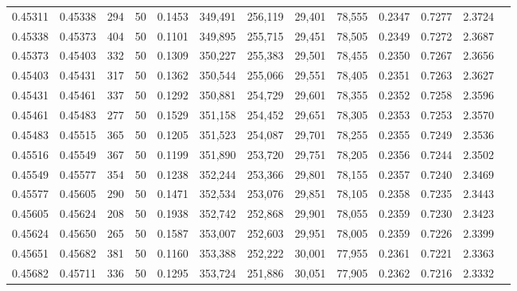 \begin{tabular}{rrrrrrrrrrrrr}
0.45311 & 0.45338 &   294 &  50 &                                     0.1453 & 349,491 & 256,119 &  29,401 &  78,555 & 0.2347 & 0.7277 & 2.3724 \\
0.45338 & 0.45373 &   404 &  50 &                                     0.1101 & 349,895 & 255,715 &  29,451 &  78,505 & 0.2349 & 0.7272 & 2.3687 \\
0.45373 & 0.45403 &   332 &  50 &                                     0.1309 & 350,227 & 255,383 &  29,501 &  78,455 & 0.2350 & 0.7267 & 2.3656 \\
0.45403 & 0.45431 &   317 &  50 &                                     0.1362 & 350,544 & 255,066 &  29,551 &  78,405 & 0.2351 & 0.7263 & 2.3627 \\
0.45431 & 0.45461 &   337 &  50 &                                     0.1292 & 350,881 & 254,729 &  29,601 &  78,355 & 0.2352 & 0.7258 & 2.3596 \\
0.45461 & 0.45483 &   277 &  50 &                                     0.1529 & 351,158 & 254,452 &  29,651 &  78,305 & 0.2353 & 0.7253 & 2.3570 \\
0.45483 & 0.45515 &   365 &  50 &                                     0.1205 & 351,523 & 254,087 &  29,701 &  78,255 & 0.2355 & 0.7249 & 2.3536 \\
0.45516 & 0.45549 &   367 &  50 &                                     0.1199 & 351,890 & 253,720 &  29,751 &  78,205 & 0.2356 & 0.7244 & 2.3502 \\
0.45549 & 0.45577 &   354 &  50 &                                     0.1238 & 352,244 & 253,366 &  29,801 &  78,155 & 0.2357 & 0.7240 & 2.3469 \\
0.45577 & 0.45605 &   290 &  50 &                                     0.1471 & 352,534 & 253,076 &  29,851 &  78,105 & 0.2358 & 0.7235 & 2.3443 \\
0.45605 & 0.45624 &   208 &  50 &                                     0.1938 & 352,742 & 252,868 &  29,901 &  78,055 & 0.2359 & 0.7230 & 2.3423 \\
0.45624 & 0.45650 &   265 &  50 &                                     0.1587 & 353,007 & 252,603 &  29,951 &  78,005 & 0.2359 & 0.7226 & 2.3399 \\
0.45651 & 0.45682 &   381 &  50 &                                     0.1160 & 353,388 & 252,222 &  30,001 &  77,955 & 0.2361 & 0.7221 & 2.3363 \\
0.45682 & 0.45711 &   336 &  50 &                                     0.1295 & 353,724 & 251,886 &  30,051 &  77,905 & 0.2362 & 0.7216 & 2.3332 \\

\end{tabular}
